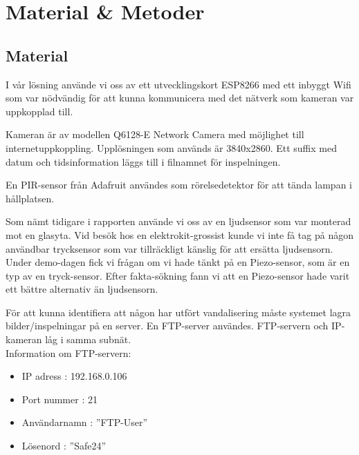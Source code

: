 



\chapter{Material \& Metoder} %
\label{ch:metoder}


\ifpdf
    \graphicspath{{8/figures/PNG/}{8_materials_and_methods/figures/PDF/}{8_materials_and_methods/figures/}}
\else
    \graphicspath{{8/figures/EPS/}{8_materials_and_methods/figures/}}
\fi


\section{Material}
I vår lösning använde vi oss av ett utvecklingskort ESP8266 med ett inbyggt Wifi som var nödvändig för att kunna kommunicera med det nätverk som kameran var uppkopplad till.

Kameran är av modellen Q6128-E Network Camera med möjlighet till internetuppkoppling. Upplösningen som används är 3840x2860. Ett suffix med datum och tidsinformation läggs till i filnamnet för inspelningen.

En PIR-sensor från Adafruit användes som rörelsedetektor för att tända lampan i hållplatsen.

Som nämt tidigare i rapporten använde vi oss av en ljudsensor som var monterad mot en glasyta. Vid besök hos en elektrokit-grossist kunde vi inte få tag på någon användbar trycksensor som var tillräckligt känslig för att ersätta ljudsensorn. Under demo-dagen fick vi frågan om vi hade tänkt på en Piezo-sensor, som är en typ av en tryck-sensor. Efter fakta-sökning fann vi att en Piezo-sensor hade varit ett bättre alternativ än ljudsensorn.

För att kunna identifiera att någon har utfört vandalisering måste systemet lagra bilder/inspelningar på en server. En FTP-server användes. FTP-servern och IP-kameran låg i samma subnät.\\

Information om FTP-servern:

\begin{itemize}
\item IP adress : 192.168.0.106

\item Port nummer : 21

\item Användarnamn : ”FTP-User”

\item Lösenord : ”Safe24”

\end{itemize}

